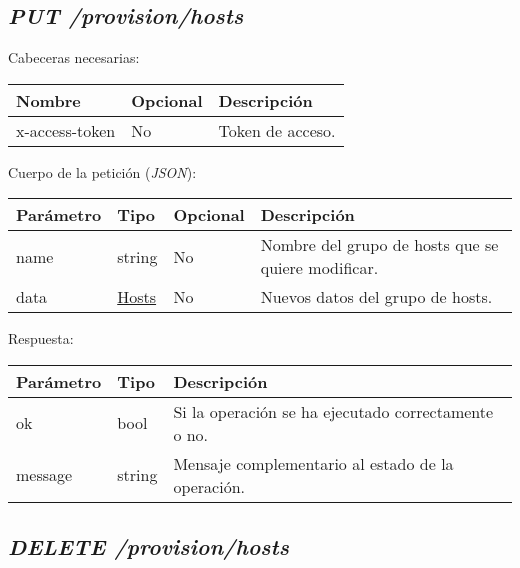 \subsection{\textit{PUT /provision/hosts}}

Cabeceras necesarias:
\begin{table}[h!]
	\centering
	\begin{adjustbox}{max width=\textwidth}
	\begin{tabular}{|l|l|l|}
		\hline
		Nombre & Opcional & Descripción \\ \hline
		x-access-token & No & Token de acceso. \\ \hline
	\end{tabular}
\end{adjustbox}
\end{table}

Cuerpo de la petición (\textit{JSON}):
\begin{table}[h!]
	\centering
	\begin{adjustbox}{max width=\textwidth}
	\begin{tabularx}{\linewidth}{|l|l|l|L|}
		\hline
		Parámetro & Tipo & Opcional & Descripción \\ \hline
		name & string & No & Nombre del grupo de hosts que se quiere modificar. \\ \hline
		data & \hyperref[sec:hosts]{Hosts} & No & Nuevos datos del grupo de hosts. \\ \hline
	\end{tabularx}
\end{adjustbox}
\end{table}


Respuesta:
\begin{table}[h!]
	\centering
	\begin{adjustbox}{max width=\textwidth}
	\begin{tabular}{|l|l|l|}
		\hline
		Parámetro & Tipo & Descripción \\ \hline
		ok & bool & Si la operación se ha ejecutado correctamente o no. \\ \hline
		message & string & Mensaje complementario al estado de la operación. \\ \hline
	\end{tabular}
\end{adjustbox}
\end{table}

\subsection{\textit{DELETE /provision/hosts}}

